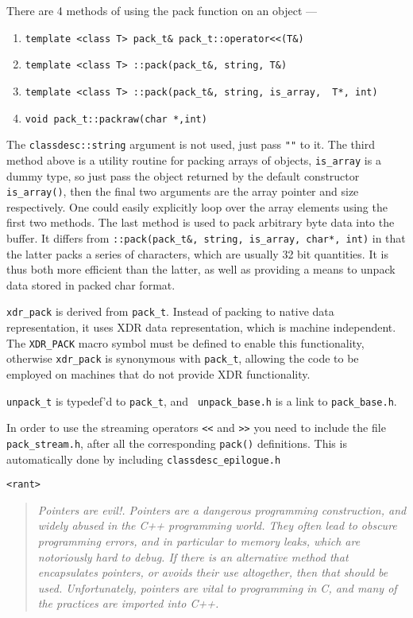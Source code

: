 There are 4 methods of using the pack function on an object ---
\begin{enumerate}
\item \verb+template <class T> pack_t& pack_t::operator<<(T&)+
\item \verb+template <class T> ::pack(pack_t&, string, T&)+ 
\item \verb+template <class T> ::pack(pack_t&, string, is_array,  T*, int)+
\item \verb+void pack_t::packraw(char *,int)+
\end{enumerate}
The \verb+classdesc::string+ argument is not used, just pass \verb+""+ to
it. The third method above is a utility routine for packing arrays of
objects, \verb+is_array+ is a dummy type, so just pass the object
returned by the default constructor \verb+is_array()+, then the final
two arguments are the array pointer and size respectively. One could
easily explicitly loop over the array elements using the first two
methods.  The last method is used to pack arbitrary byte data into the
buffer.  It differs from
\verb+::pack(pack_t&, string, is_array, char*, int)+ in that the
latter packs a series of characters, which are usually 32 bit
quantities. It is thus both more efficient than the latter, as well as
providing a means to unpack data stored in packed char format.

\verb+xdr_pack+ is derived from \verb+pack_t+.
Instead of packing to native data representation, it uses XDR data
representation, which is machine independent. The
\verb+XDR_PACK+\label{XDR} macro symbol must be defined to
enable this functionality, otherwise \verb+xdr_pack+ is synonymous
with \verb+pack_t+, allowing the code to be employed on machines that
do not provide XDR functionality.

{\tt unpack\_t} is typedef'd to {\tt pack\_t}, and {\tt
  unpack\_base.h} is a link to {\tt pack\_base.h}.

In order to use the streaming operators \verb+<<+ and \verb+>>+ you
need to include the file \verb+pack_stream.h+, after all the
corresponding \verb+pack()+ definitions. This is automatically done by
including \verb+classdesc_epilogue.h+

\label{pointers}

\verb+<rant>+

\begin{quote}{\em
{\em Pointers are evil!}. Pointers are a dangerous
programming construction, and widely abused in the C++ programming
world. They often lead to obscure programming errors, and in
particular to {\em memory leaks}, which are notoriously hard to
debug. If there is an alternative method that encapsulates pointers,
or avoids their use altogether, then that should be
used. Unfortunately, pointers are vital to programming in C, and many
of the practices are imported into C++.
}\end{quote}

